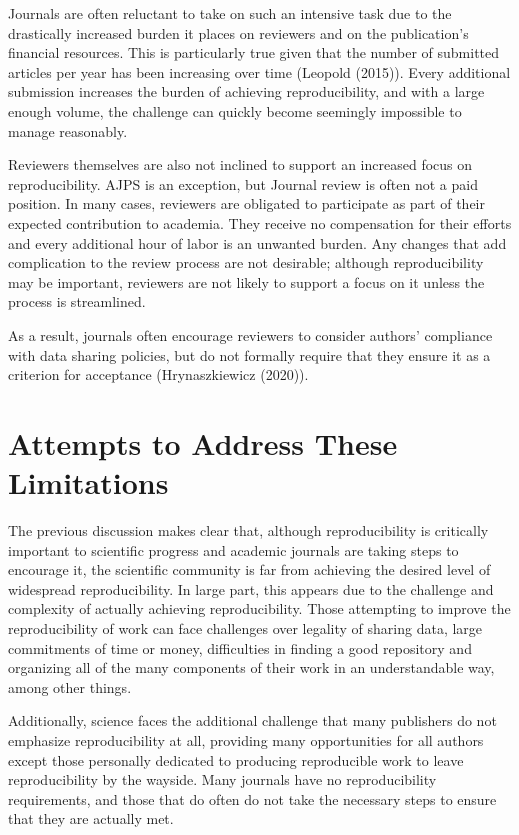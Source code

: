 \documentclass[12pt,twoside]{reedthesis}
\begin{document}
Journals are often reluctant to take on such an intensive task due to the drastically increased burden it places on reviewers and on the publication's financial resources. This is particularly true given that the number of submitted articles per year has been increasing over time (Leopold (2015)). Every additional submission increases the burden of achieving reproducibility, and with a large enough volume, the challenge can quickly become seemingly impossible to manage reasonably.

Reviewers themselves are also not inclined to support an increased focus on reproducibility. AJPS is an exception, but Journal review is often not a paid position. In many cases, reviewers are obligated to participate as part of their expected contribution to academia. They receive no compensation for their efforts and every additional hour of labor is an unwanted burden. Any changes that add complication to the review process are not desirable; although reproducibility may be important, reviewers are not likely to support a focus on it unless the process is streamlined.

As a result, journals often encourage reviewers to consider authors' compliance with data sharing policies, but do not formally require that they ensure it as a criterion for acceptance (Hrynaszkiewicz (2020)).

\hypertarget{attempts-to-address-these-limitations}{%
\section{Attempts to Address These Limitations}\label{attempts-to-address-these-limitations}}

The previous discussion makes clear that, although reproducibility is critically important to scientific progress and academic journals are taking steps to encourage it, the scientific community is far from achieving the desired level of widespread reproducibility. In large part, this appears due to the challenge and complexity of actually achieving reproducibility. Those attempting to improve the reproducibility of work can face challenges over legality of sharing data, large commitments of time or money, difficulties in finding a good repository and organizing all of the many components of their work in an understandable way, among other things.

Additionally, science faces the additional challenge that many publishers do not emphasize reproducibility at all, providing many opportunities for all authors except those personally dedicated to producing reproducible work to leave reproducibility by the wayside. Many journals have no reproducibility requirements, and those that do often do not take the necessary steps to ensure that they are actually met.
\end{document}
